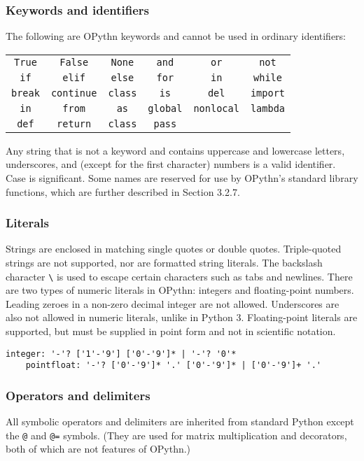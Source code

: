 \documentclass[11pt, twoside]{article}
\newcommand{\ms}{\texttt}
\begin{document}
    \subsubsection{Keywords and identifiers}
    The following are OPythn keywords and cannot be used in ordinary identifiers:
    \begin{center}
        \begin{tabular}{cccccc}
            \ms{True} & \ms{False} & \ms{None} & \ms{and} & \ms{or} & \ms{not}\\
            \ms{if} & \ms{elif} & \ms{else} & \ms{for} & \ms{in} & \ms{while}\\
            \ms{break} & \ms{continue} & \ms{class} & \ms{is} & \ms{del} & \ms{import}\\
            \ms{in} & \ms{from} & \ms{as} &\ms{global} & \ms{nonlocal} & \ms{lambda}\\
            \ms{def} & \ms{return} & \ms{class} & \ms{pass} &&
    \end{tabular}
    \end{center}
    Any string that is not a keyword and contains uppercase and lowercase letters, underscores, and (except for the first character) numbers is a valid identifier. Case is significant. Some names are reserved for use by OPythn's standard library functions, which are further described in Section 3.2.7.
    \subsubsection{Literals}
    Strings are enclosed in matching single quotes or double quotes. Triple-quoted strings are not supported, nor are formatted string literals. The backslash character \ms{\textbackslash} is used to escape certain characters such as tabs and newlines.
    \indent There are two types of numeric literals in OPythn: integers and floating-point numbers. Leading zeroes in a non-zero decimal integer are not allowed. Underscores are also not allowed in numeric literals, unlike in Python 3. Floating-point literals are supported, but must be supplied in point form and not in scientific notation.
    \begin{lstlisting}[language=caml]
    integer: '-'? ['1'-'9'] ['0'-'9']* | '-'? '0'*
    pointfloat: '-'? ['0'-'9']* '.' ['0'-'9']* | ['0'-'9']+ '.'
    \end{lstlisting}
    \subsubsection{Operators and delimiters}
    All symbolic operators and delimiters are inherited from standard Python except the \ms{@} and \ms{@=} symbols. (They are used for matrix multiplication and decorators, both of which are not features of OPythn.)
\end{document}
